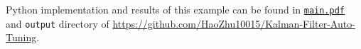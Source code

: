 Python implementation and results of this example can be found in \href{https://github.com/HaoZhu10015/Kalman-Filter-Auto-Tuning/blob/9c6169a3c3f79520a67ddd6fd3b3b1a05f100a83/main.py}{\texttt{main.pdf}} and \texttt{output} directory of \href{https://github.com/HaoZhu10015/Kalman-Filter-Auto-Tuning}{https://github.com/HaoZhu10015/Kalman-Filter-Auto-Tuning}.